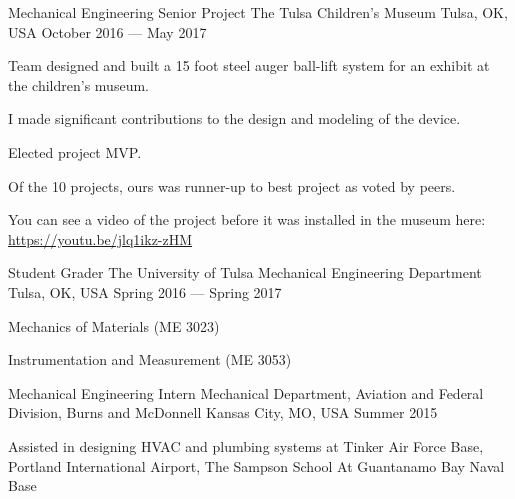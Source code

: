 

\begin{cventries}
	
\cventry
	{Mechanical Engineering Senior Project} %
	{The Tulsa Children's Museum} %
	{Tulsa, OK, USA} %
	{October 2016 --- May 2017} %
	{
		\begin{cvitems} %
			\item{Team designed and built a 15 foot steel auger ball-lift system for an exhibit at the children's museum.}
			\item{I made significant contributions to the design and modeling of the device.}
			\item{Elected project MVP.}
			\item{Of the 10 projects, ours was runner-up to best project as voted by peers.}
			\item{You can see a video of the project before it was installed in the museum here: \href{https://youtu.be/jlq1ikz-zHM}{\color{awesome} https://youtu.be/jlq1ikz-zHM}}
		\end{cvitems}
	}

  \cventry
    {Student Grader} %
    {The University of Tulsa Mechanical Engineering Department} %
    {Tulsa, OK, USA} %
    {Spring 2016 --- Spring 2017} %
    {
      \begin{cvitems} %
        \item{Mechanics of Materials (ME 3023)}
        \item{Instrumentation and Measurement (ME 3053)}
      \end{cvitems}
    }

\cventry
	{Mechanical Engineering Intern} %
	{Mechanical Department, Aviation and Federal Division, Burns and McDonnell} %
	{Kansas City, MO, USA} %
	{Summer 2015} %
	{
		\begin{cvitems} %
			\item{Assisted in designing HVAC and plumbing systems at Tinker Air Force Base, Portland International Airport, The Sampson School At Guantanamo Bay Naval Base}
		\end{cvitems}
	}


\end{cventries}
